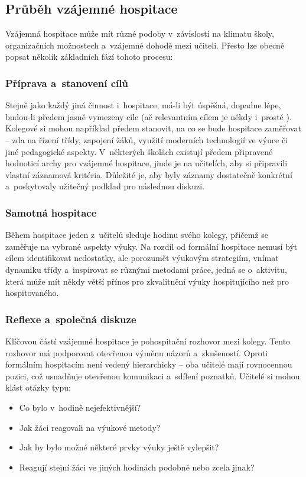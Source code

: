 \subsection{Průběh vzájemné hospitace}
Vzájemná hospitace může mít různé podoby v~závislosti na klimatu školy, organizačních možnostech a~vzájemné dohodě mezi učiteli. Přesto lze obecně popsat několik základních fází tohoto procesu:

\subsubsection{Příprava a~stanovení cílů}
Stejně jako každý jiná činnost i~hospitace, má-li být úspěšná, dopadne lépe, budou-li předem jasně vymezeny cíle (ač relevantním cílem je někdy i~prosté ). Kolegové si mohou například předem stanovit, na co se bude hospitace zaměřovat – zda na řízení třídy, zapojení žáků, využití moderních technologií ve výuce či jiné pedagogické aspekty. V~některých školách existují předem připravené hodnoticí archy pro vzájemné hospitace, jinde je na učitelích, aby si připravili vlastní záznamová kritéria. Důležité je, aby byly záznamy dostatečně konkrétní a~poskytovaly užitečný podklad pro následnou diskuzi.

\subsubsection{Samotná hospitace}
Během hospitace jeden z~učitelů sleduje hodinu svého kolegy, přičemž se zaměřuje na vybrané aspekty výuky. Na rozdíl od formální hospitace nemusí být cílem identifikovat nedostatky, ale porozumět výukovým strategiím, vnímat dynamiku třídy a~inspirovat se různými metodami práce, jedná se o~aktivitu, která může mít někdy větší přínos pro zkvalitnění výuky hospitujícího než pro hospitovaného.

\subsubsection{Reflexe a~společná diskuze}
Klíčovou částí vzájemné hospitace je pohospitační rozhovor mezi kolegy. Tento rozhovor má podporovat otevřenou výměnu názorů a~zkušeností. Oproti formálním hospitacím není vedený hierarchicky – oba učitelé mají rovnocennou pozici, což usnadňuje otevřenou komunikaci a~sdílení poznatků. Učitelé si mohou klást otázky typu:
\begin{itemize}
    \item Co bylo v~hodině nejefektivnější?
    \item Jak žáci reagovali na výukové metody?
    \item Jak by bylo možné některé prvky výuky ještě vylepšit?
    \item Reagují stejní žáci ve jiných hodinách podobně nebo zcela jinak?
\end{itemize}


